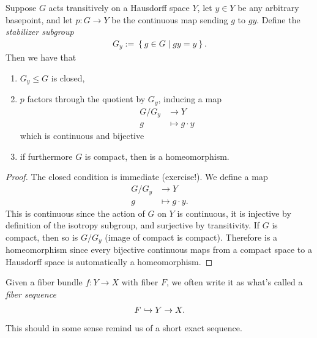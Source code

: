 \documentclass[11pt]{book}
\begin{document}
\begin{proposition}\label{prop:factor-space-via-group-action} 
Suppose $G$ acts transitively on a Hausdorff space $Y$, let $y\in Y$ be any arbitrary basepoint, and let $p \colon G \to Y$ be the continuous map sending $g$ to $gy$. Define the \emph{stabilizer subgroup}
\begin{align*}
    G_y := \left\{ g\in G \mid gy=y \right\}.
\end{align*}
Then we have that
\begin{enumerate}
    \item $G_y \le G$ is closed,
    \item $p$ factors through the quotient by $G_y$, inducing a map
    \begin{equation}\label{eqn:action-mod-isotropy-bijection}
    \begin{aligned}
        G/G_y &\to Y \\
        g &\mapsto g\cdot y
    \end{aligned}
    \end{equation}
    which is continuous and bijective
    \item if furthermore $G$ is compact, then  is a homeomorphism.
\end{enumerate}
\end{proposition}
\begin{proof}
The closed condition is immediate (exercise!). We define a map
\begin{align*}
    G/G_y &\to Y \\
    g &\mapsto g\cdot y.
\end{align*}
This is continuous since the action of $G$ on $Y$ is continuous, it is injective by definition of the isotropy subgroup, and surjective by transitivity. If $G$ is compact, then so is $G/G_y$ (image of compact is compact). Therefore  is a homeomorphism since every bijective continuous maps from a compact space to a Hausdorff space is automatically a homeomorphism.
\end{proof}


\begin{notation} Given a fiber bundle $f \colon Y\to X$ with fiber $F$, we often write it as what's called a \emph{fiber sequence}
\begin{align*}
    F \xhookrightarrow{} Y \to X.
\end{align*}
This should in some sense remind us of a short exact sequence.
\end{notation}
\end{document}

